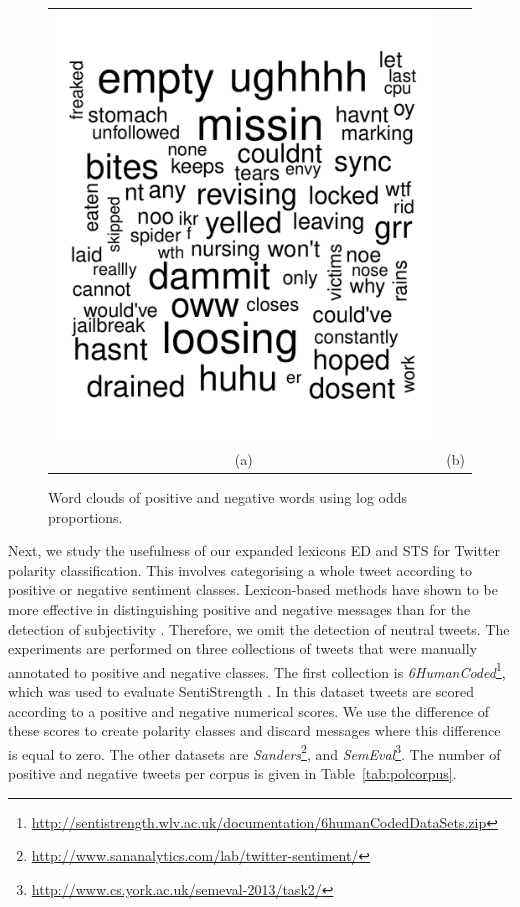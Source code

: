 \documentclass{sig-alternate}
\begin{document}
\begin{figure}[ht]
\begin{center}
\begin{tabular}{cc}
\includegraphics[scale=0.25]{negwords.pdf}\\
(a) & (b)  
\end{tabular}
\caption{Word clouds of positive and negative words using log odds proportions.}
\label{fig:wordcloud}
\end{center}
\end{figure}



Next, we study the usefulness of our expanded lexicons ED and STS for Twitter polarity classification. This involves categorising a whole tweet according to positive or negative sentiment classes. Lexicon-based methods have shown to be more effective in distinguishing positive and negative messages than for the detection of subjectivity \cite{BravoMarquez2014}. Therefore, we omit the detection of neutral tweets. The experiments are performed on three collections of tweets that were manually annotated to positive and negative classes. The first collection is  \emph{6HumanCoded}\footnote{\url{http://sentistrength.wlv.ac.uk/documentation/6humanCodedDataSets.zip}}, which was used to evaluate SentiStrength \cite{ThelwallBP12}.  In this dataset tweets are scored according to a positive and negative numerical scores. We use the difference of these scores to create polarity classes and discard messages where this difference is equal to zero. The other datasets are   \emph{Sanders}\footnote{\url{http://www.sananalytics.com/lab/twitter-sentiment/}}, and \emph{SemEval}\footnote{\url{http://www.cs.york.ac.uk/semeval-2013/task2/}}. The number of positive and negative tweets per corpus is given in Table~\ref{tab:polcorpus}.
  
\end{document}
